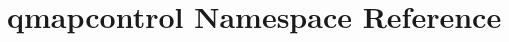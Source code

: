 \hypertarget{namespaceqmapcontrol}{}\section{qmapcontrol Namespace Reference}
\label{namespaceqmapcontrol}
